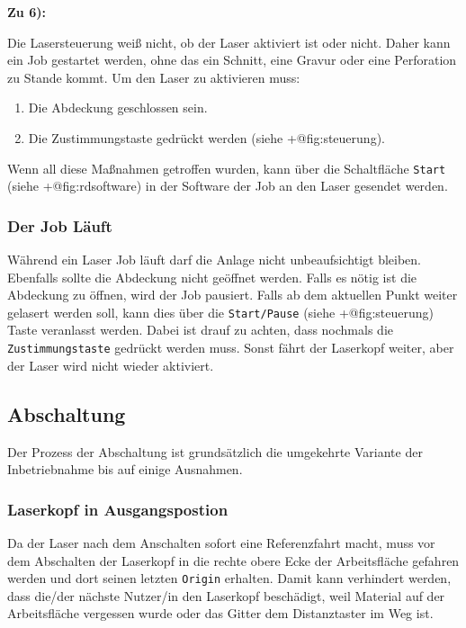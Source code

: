\documentclass[]{article}
\providecommand{\tightlist}{%
  \setlength{\itemsep}{0pt}\setlength{\parskip}{0pt}}
\begin{document}
\textbf{Zu 6):}

Die Lasersteuerung weiß nicht, ob der Laser aktiviert ist oder nicht.
Daher kann ein Job gestartet werden, ohne das ein Schnitt, eine Gravur
oder eine Perforation zu Stande kommt. Um den Laser zu aktivieren muss:

\begin{enumerate}
\def\labelenumi{\arabic{enumi}.}
\tightlist
\item
  Die Abdeckung geschlossen sein.
\item
  Die Zustimmungstaste gedrückt werden (siehe +@fig:steuerung).
\end{enumerate}

Wenn all diese Maßnahmen getroffen wurden, kann über die Schaltfläche
\texttt{Start} (siehe +@fig:rdsoftware) in der Software der Job an den
Laser gesendet werden.

\hypertarget{der-job-luxe4uft}{%
\subsubsection{Der Job Läuft}\label{der-job-luxe4uft}}

Während ein Laser Job läuft darf die Anlage nicht unbeaufsichtigt
bleiben. Ebenfalls sollte die Abdeckung nicht geöffnet werden. Falls es
nötig ist die Abdeckung zu öffnen, wird der Job pausiert. Falls ab dem
aktuellen Punkt weiter gelasert werden soll, kann dies über die
\texttt{Start/Pause} (siehe +@fig:steuerung) Taste veranlasst werden.
Dabei ist drauf zu achten, dass nochmals die \texttt{Zustimmungstaste}
gedrückt werden muss. Sonst fährt der Laserkopf weiter, aber der Laser
wird nicht wieder aktiviert.

\hypertarget{abschaltung}{%
\subsection{Abschaltung}\label{abschaltung}}

Der Prozess der Abschaltung ist grundsätzlich die umgekehrte Variante
der Inbetriebnahme bis auf einige Ausnahmen.

\hypertarget{laserkopf-in-ausgangspostion}{%
\subsubsection{Laserkopf in
Ausgangspostion}\label{laserkopf-in-ausgangspostion}}

Da der Laser nach dem Anschalten sofort eine Referenzfahrt macht, muss
vor dem Abschalten der Laserkopf in die rechte obere Ecke der
Arbeitsfläche gefahren werden und dort seinen letzten \texttt{Origin}
erhalten. Damit kann verhindert werden, dass die/der nächste Nutzer/in
den Laserkopf beschädigt, weil Material auf der Arbeitsfläche vergessen
wurde oder das Gitter dem Distanztaster im Weg ist.
\end{document}
